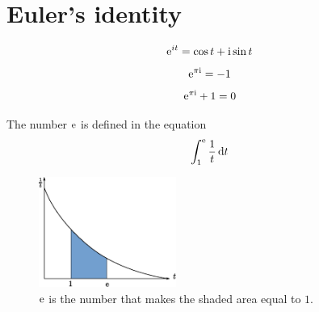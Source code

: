 \section{Euler's identity}
\begin{equation}
    \mathrm e ^{it} = \cos t + \mathrm i \sin t
\end{equation}
\begin{equation}
    \mathrm e^{\pi \mathrm i} = -1
\end{equation}
\begin{equation}
    \mathrm e^{\pi \mathrm i} + 1 = 0
    \label{eq:euler-identity}
\end{equation}
\begin{remark}
    The number $\mathrm e$ is defined in the equation
    \begin{equation}
        \int^\mathrm e_1 \frac{1}{t} \,\mathrm{d} t
    \end{equation}
    \begin{figure}[H]
        \begin{center}
            \includegraphics[width=0.4\textwidth]{continuous/ode/defn_e}
            \caption{$\mathrm e$ is the number that makes the shaded area equal to $1$.}
        \end{center}
    \end{figure}
\end{remark}
